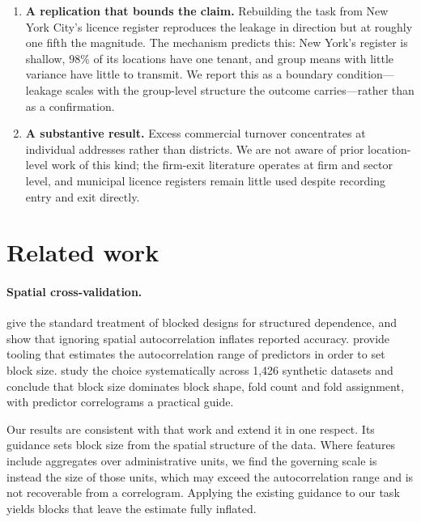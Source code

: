 \documentclass[11pt]{article}
\begin{document}
\begin{enumerate}
\item \textbf{A replication that bounds the claim.} Rebuilding the task from
New York City's licence register reproduces the leakage in direction but at
roughly one fifth the magnitude. The mechanism predicts this: New York's
register is shallow, $98\%$ of its locations have one tenant, and group means
with little variance have little to transmit. We report this as a boundary
condition---leakage scales with the group-level structure the outcome
carries---rather than as a confirmation.

\item \textbf{A substantive result.} Excess commercial turnover concentrates at
individual addresses rather than districts. We are not aware of prior
location-level work of this kind; the firm-exit literature operates at firm and
sector level, and municipal licence registers remain little used despite
recording entry and exit directly.
\end{enumerate}

\section{Related work}

\paragraph{Spatial cross-validation.}
\citet{roberts2017} give the standard treatment of blocked designs for
structured dependence, and \citet{ploton2020} show that ignoring spatial
autocorrelation inflates reported accuracy. \citet{valavi2019} provide tooling
that estimates the autocorrelation range of predictors in order to set block
size. \citet{stock2025} study the choice systematically across 1{,}426 synthetic
datasets and conclude that block size dominates block shape, fold count and fold
assignment, with predictor correlograms a practical guide.

Our results are consistent with that work and extend it in one respect. Its
guidance sets block size from the spatial structure of the data. Where features
include aggregates over administrative units, we find the governing scale is
instead the size of those units, which may exceed the autocorrelation range and
is not recoverable from a correlogram. Applying the existing guidance to our task
yields blocks that leave the estimate fully inflated.
\end{document}
